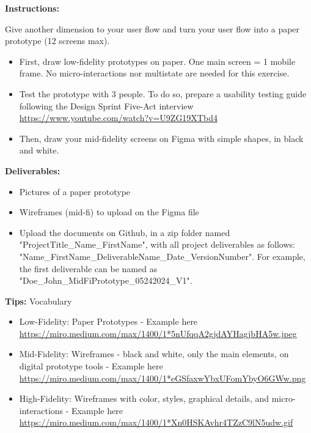 \makeheaderfiles

\textbf{Instructions:}

Give another dimension to your user flow and turn your user flow into a paper prototype (12 screens max).

\begin{itemize}
\item First, draw low-fidelity prototypes on paper. One main screen = 1 mobile frame. No micro-interactions nor multistate are needed for this exercise.
\item Test the prototype with 3 people. To do so, prepare a usability testing guide following the Design Sprint Five-Act interview \url{https://www.youtube.com/watch?v=U9ZG19XTbd4}
\item Then, draw your mid-fidelity screens on Figma with simple shapes, in black and white.
\end{itemize}

\textbf{Deliverables:}

\begin{itemize}
\item Pictures of a paper prototype
\item Wireframes (mid-fi) to upload on the Figma file
\item Upload the documents on Github, in a zip folder named "ProjectTitle\_Name\_FirstName", with all project deliverables as follows: "Name\_FirstName\_DeliverableName\_Date\_VersionNumber".  For example, the first deliverable can be named as "Doe\_John\_MidFiPrototype\_05242024\_V1".
\end{itemize}

\textbf{Tips:} Vocabulary

\begin{itemize}
\item Low-Fidelity: Paper Prototypes - Example here \url{https://miro.medium.com/max/1400/1*5nUfqqA2gjdAYHagjbHA5w.jpeg}
\item Mid-Fidelity: Wireframes - black and white, only the main elements, on digital prototype tools - Example here \url{https://miro.medium.com/max/1400/1*eGSfaxwYbxUFomYbyO6GWw.png}
\item High-Fidelity: Wireframes with color, styles, graphical details, and micro-interactions - Example here \url{https://miro.medium.com/max/1400/1*Xn0HSKAvhr4TZzC9lN5udw.gif}
\end{itemize}

